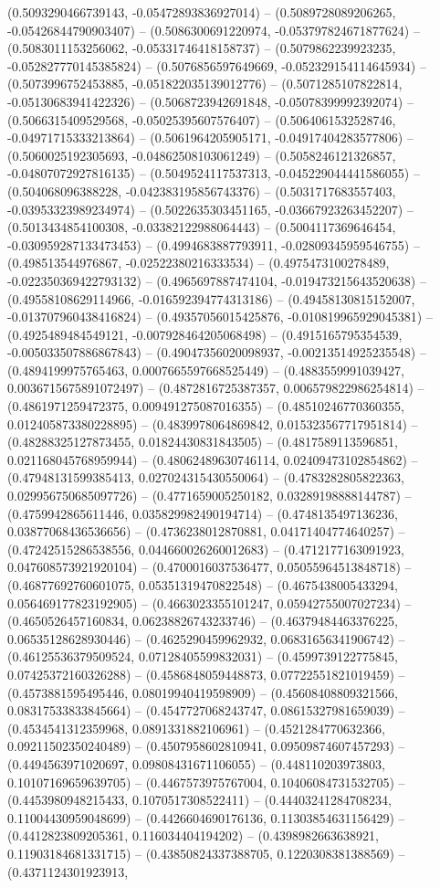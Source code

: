 (0.5093290466739143, -0.05472893836927014) -- (0.5089728089206265, -0.05426844790903407) -- (0.5086300691220974, -0.053797824671877624) -- (0.5083011153256062, -0.05331746418158737) -- (0.5079862239923235, -0.052827770145385824) -- (0.5076856597649669, -0.052329154114645934) -- (0.5073996752453885, -0.051822035139012776) -- (0.5071285107822814, -0.05130683941422326) -- (0.5068723942691848, -0.05078399992392074) -- (0.5066315409529568, -0.05025395607576407) -- (0.5064061532528746, -0.04971715333213864) -- (0.5061964205905171, -0.04917404283577806) -- (0.5060025192305693, -0.04862508103061249) -- (0.5058246121326857, -0.04807072927816135) -- (0.5049524117537313, -0.045229044441586055) -- (0.504068096388228, -0.042383195856743376) -- (0.5031717683557403, -0.03953323989234974) -- (0.5022635303451165, -0.03667923263452207) -- (0.5013434854100308, -0.03382122988064443) -- (0.5004117369646454, -0.030959287133473453) -- (0.4994683887793911, -0.02809345959546755) -- (0.498513544976867, -0.02522380216333534) -- (0.4975473100278489, -0.022350369422793132) -- (0.4965697887474104, -0.019473215643520638) -- (0.49558108629114966, -0.016592394774313186) -- (0.49458130815152007, -0.013707960438416824) -- (0.49357056015425876, -0.010819965929045381) -- (0.4925489484549121, -0.007928464205068498) -- (0.4915165795354539, -0.005033507886867843) -- (0.49047356020098937, -0.00213514925235548) -- (0.4894199975765463, 0.0007665597668525449) -- (0.4883559991039427, 0.0036715675891072497) -- (0.4872816725387357, 0.006579822986254814) -- (0.4861971259472375, 0.009491275087016355) -- (0.48510246770360355, 0.012405873380228895) -- (0.4839978064869842, 0.015323567717951814) -- (0.48288325127873455, 0.01824430831843505) -- (0.4817589113596851, 0.021168045768959944) -- (0.48062489630746114, 0.02409473102854862) -- (0.47948131599385413, 0.027024315430550064) -- (0.4783282805822363, 0.029956750685097726) -- (0.4771659005250182, 0.03289198888144787) -- (0.4759942865611446, 0.035829982490194714) -- (0.4748135497136236, 0.03877068436536656) -- (0.4736238012870881, 0.04171404774640257) -- (0.47242515286538556, 0.044660026260012683) -- (0.4712177163091923, 0.047608573921920104) -- (0.4700016037536477, 0.05055964513848718) -- (0.46877692760601075, 0.05351319470822548) -- (0.4675438005433294, 0.056469177823192905) -- (0.4663023355101247, 0.05942755007027234) -- (0.4650526457160834, 0.06238826743233746) -- (0.46379484463376225, 0.06535128628930446) -- (0.4625290459962932, 0.06831656341906742) -- (0.46125536379509524, 0.07128405599832031) -- (0.4599739122775845, 0.07425372160326288) -- (0.4586848059448873, 0.07722551821019459) -- (0.4573881595495446, 0.08019940419598909) -- (0.45608408809321566, 0.08317533833845664) -- (0.4547727068243747, 0.08615327981659039) -- (0.4534541312359968, 0.0891331882106961) -- (0.4521284770632366, 0.09211502350240489) -- (0.4507958602810941, 0.09509874607457293) -- (0.4494563971020697, 0.09808431671106055) -- (0.448110203973803, 0.10107169659639705) -- (0.4467573975767004, 0.10406084731532705) -- (0.4453980948215433, 0.1070517308522411) -- (0.44403241284708234, 0.11004430959048699) -- (0.4426604690176136, 0.11303854631156429) -- (0.4412823809205361, 0.116034404194202) -- (0.4398982663638921, 0.11903184681331715) -- (0.43850824337388705, 0.1220308381388569) -- (0.4371124301923913, 